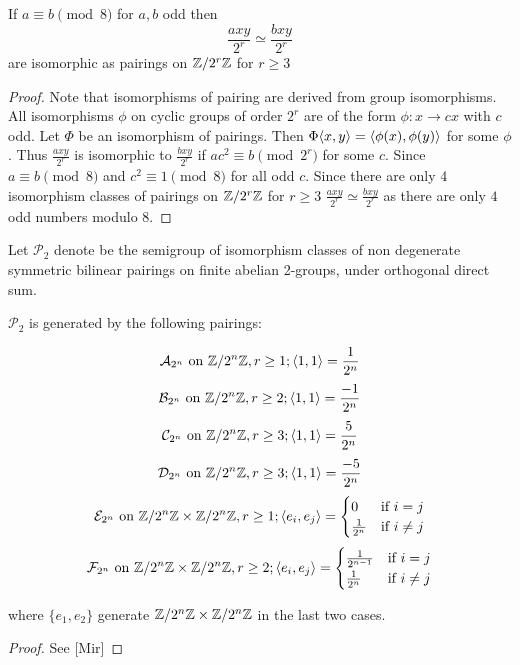 \documentclass{amsart}
\begin{document}
\begin{lem}
 \label{lemma:2-group iso}
 If $a\equiv b\pmod 8$ for $a,b$ odd then
 \begin{equation}
  \frac{axy}{2^{r}}\simeq  \frac{bxy}{2^{r}}
 \end{equation}
  are isomorphic as pairings on $\mathbb{Z}/2^r\mathbb{Z}$ for $r\ge3$
\end{lem}
\begin{proof}
 Note that isomorphisms of pairing are derived from group isomorphisms. All isomorphisms $\phi$ on cyclic groups of order $2^{r}$ are of the form $\phi:x\to cx$ with $c$ odd. Let $\Phi$ be an isomorphism of pairings. Then $\Phi\langle x, y \rangle=\langle \phi(x), \phi(y) \rangle$ for some $\phi$. Thus $\frac{axy}{2^{r}}$ is isomorphic to $\frac{bxy}{2^{r}}$ if  $ac^{2}\equiv b\pmod 2^{r}$ for some $c$. Since $a\equiv b\pmod 8$ and $c^{2}\equiv 1\pmod 8$ for all odd $c$. Since there are only $4$ isomorphism classes of pairings on $\mathbb{Z}/2^r\mathbb{Z}$ for $r\ge3$ %
 $\frac{axy}{2^{r}}\simeq  \frac{bxy}{2^{r}}$ as there are only $4$ odd numbers modulo $8$.
\end{proof}

\begin{defn}
 Let $\mathcal{P}_{2}$ denote be the semigroup of
isomorphism classes of non degenerate symmetric bilinear pairings on
finite abelian 2-groups, under orthogonal direct sum.

\end{defn}

 \begin{prop} $\mathcal{P}_{2}$ is generated by the following
pairings:
  
   \[ \mathcal{A}_{2^{n}} \text{ on } \mathbb{Z}/2^{n}\mathbb{Z}, r\ge 1; \langle 1,
1\rangle=\frac{1}{2^{n}}
   \]
   \[ \mathcal{B}_{2^{n}} \text{ on } \mathbb{Z}/2^{n}\mathbb{Z}, r\ge 2; \langle 1,
1\rangle=\frac{-1}{2^{n}}
   \]
   \[ \mathcal{C}_{2^{n}} \text{ on } \mathbb{Z}/2^{n}\mathbb{Z}, r\ge 3; \langle 1,
1\rangle=\frac{5}{2^{n}}
   \]
   \[ \mathcal{D}_{2^{n}} \text{ on } \mathbb{Z}/2^{n}\mathbb{Z}, r\ge 3; \langle 1,
1\rangle=\frac{-5}{2^{n}}
   \]
   \[ \mathcal{E}_{2^{n}} \text{ on } \mathbb{Z}/2^{n}\mathbb{Z}\times\mathbb{Z}/2^{n}\mathbb{Z}, r\ge 1; \langle
e_{i}, e_{j}\rangle=\begin{cases}0&\mbox{if } i=j\\
\frac{1}{2^{n}}&\mbox{if } i\neq j\end{cases}
   \]
   \[ \mathcal{F}_{2^{n}} \text{ on } \mathbb{Z}/2^{n}\mathbb{Z}\times\mathbb{Z}/2^{n}\mathbb{Z}, r\ge 2; \langle
e_{i}, e_{j}\rangle=\begin{cases}\frac{1}{2^{n-1}}&\mbox{if } i=j\\
\frac{1}{2^{n}}&\mbox{if } i\neq j\end{cases}
   \]
   
where $\{e_{1}, e_{2}\}$ generate $\mathbb{Z}/2^{n}\mathbb{Z}\times\mathbb{Z}/2^{n}\mathbb{Z}$ in the
last two cases.
 \end{prop}
 \begin{proof} See [Mir]
 \end{proof}
\end{document}
